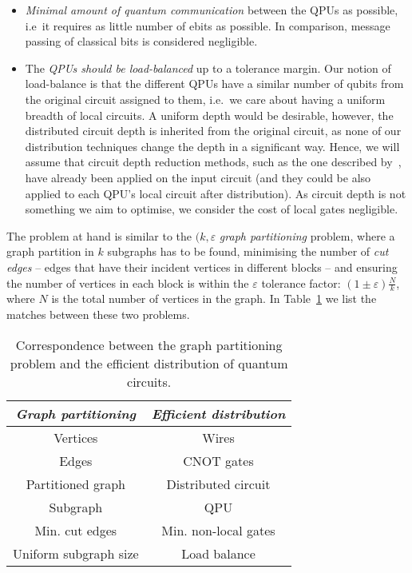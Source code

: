 \begin{itemize}
  \item \textit{Minimal amount of quantum communication} between the QPUs as possible, i.e\ it requires as little number of ebits as possible. In comparison, message passing of classical bits is considered negligible.
  \item The \textit{QPUs should be load-balanced} up to a tolerance margin. Our notion of load-balance is that the different QPUs have a similar number of qubits from the original circuit assigned to them, i.e.\ we care about having a uniform breadth of local circuits. A uniform depth would be desirable, however, the distributed circuit depth is inherited from the original circuit, as none of our distribution techniques change the depth in a significant way. Hence, we will assume that circuit depth reduction methods, such as the one described by~\citet{DepthReduction}, have already been applied on the input circuit (and they could be also applied to each QPU's local circuit after distribution). As circuit depth is not something we aim to optimise, we consider the cost of local gates negligible.
\end{itemize}

The problem at hand is similar to the \((k,\varepsilon\) \textit{graph partitioning} problem, where a graph partition in \(k\) subgraphs has to be found, minimising the number of \textit{cut edges} -- edges that have their incident vertices in different blocks -- and ensuring the number of vertices in each block is within the \(\varepsilon\) tolerance factor: \((1 \pm \varepsilon)\frac{N}{k}\), where \(N\) is the total number of vertices in the graph. In Table~\ref{tab:matching} we list the matches between these two problems.

\begin{table}
\label{tab:matching}
\caption{Correspondence between the graph partitioning problem and the efficient distribution of quantum circuits.}
\centering
\begin{tabular}{|c|c|}
\hline
\textit{Graph partitioning} & \textit{Efficient distribution} \\
\hline
Vertices & Wires \\
Edges & CNOT gates \\
Partitioned graph & Distributed circuit \\
Subgraph & QPU \\
Min. cut edges & Min. non-local gates \\
Uniform subgraph size & Load balance \\
\hline
\end{tabular}
\end{table}

